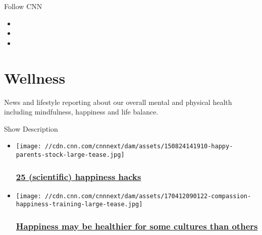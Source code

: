 Follow CNN

\begin{itemize}
\item
\item
\item
\end{itemize}

\hypertarget{wellness}{%
\section{Wellness}\label{wellness}}

News and lifestyle reporting about our overall mental and physical
health including mindfulness, happiness and life balance.

Show Description

\begin{itemize}
\item
  \href{/2016/01/22/health/happiness-hacks/index.html}{}

  \texttt{[image: //cdn.cnn.com/cnnnext/dam/assets/150824141910-happy-parents-stock-large-tease.jpg]}

  \hypertarget{25-scientific-happiness-hacks}{%
  \subsubsection{\texorpdfstring{\href{/2016/01/22/health/happiness-hacks/index.html}{25
  (scientific) happiness
  hacks}}{25 (scientific) happiness hacks}}\label{25-scientific-happiness-hacks}}
\end{itemize}

\begin{itemize}
\item
  \href{/2017/09/25/health/happiness-where-you-live-partner/index.html}{}

  \texttt{[image: //cdn.cnn.com/cnnnext/dam/assets/170412090122-compassion-happiness-training-large-tease.jpg]}

  \hypertarget{happiness-may-be-healthier-for-some-cultures-than-others}{%
  \subsubsection{\texorpdfstring{\href{/2017/09/25/health/happiness-where-you-live-partner/index.html}{Happiness
  may be healthier for some cultures than
  others}}{Happiness may be healthier for some cultures than others}}\label{happiness-may-be-healthier-for-some-cultures-than-others}}
\end{itemize}

